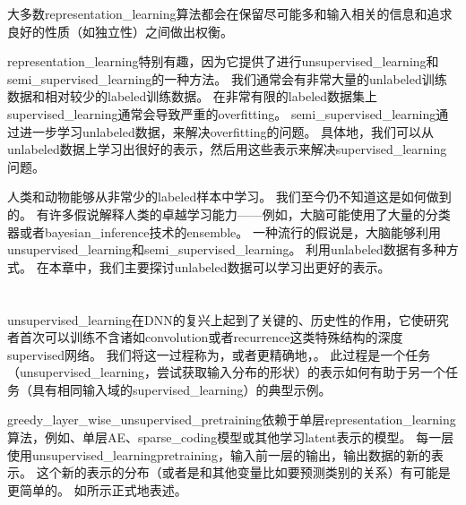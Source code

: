 大多数\gls{representation_learning}算法都会在保留尽可能多和输入相关的信息和追求良好的性质（如独立性）之间做出权衡。


\gls{representation_learning}特别有趣，因为它提供了进行\gls{unsupervised_learning}和\gls{semi_supervised_learning}的一种方法。
我们通常会有非常大量的\gls{unlabeled}训练数据和相对较少的\gls{labeled}训练数据。
在非常有限的\gls{labeled}数据集上\gls{supervised_learning}通常会导致严重的\gls{overfitting}。
\gls{semi_supervised_learning}通过进一步学习\gls{unlabeled}数据，来解决\gls{overfitting}的问题。
具体地，我们可以从\gls{unlabeled}数据上学习出很好的表示，然后用这些表示来解决\gls{supervised_learning}问题。

人类和动物能够从非常少的\gls{labeled}样本中学习。
我们至今仍不知道这是如何做到的。
有许多假说解释人类的卓越学习能力——例如，大脑可能使用了大量的分类器或者\gls{bayesian_inference}技术的\gls{ensemble}。
一种流行的假说是，大脑能够利用\gls{unsupervised_learning}和\gls{semi_supervised_learning}。
利用\gls{unlabeled}数据有多种方式。
在本章中，我们主要探讨\gls{unlabeled}数据可以学习出更好的表示。


\section{}
\label{sec:greedy_layer_wise_unsupervised_pretraining}
\gls{unsupervised_learning}在\gls{DNN}的复兴上起到了关键的、历史性的作用，它使研究者首次可以训练不含诸如\gls{convolution}或者\gls{recurrence}这类特殊结构的深度\gls{supervised}网络。
我们将这一过程称为，或者更精确地，。
此过程是一个任务（\gls{unsupervised_learning}，尝试获取输入分布的形状）的表示如何有助于另一个任务（具有相同输入域的\gls{supervised_learning}）的典型示例。


\gls{greedy_layer_wise_unsupervised_pretraining}依赖于单层\gls{representation_learning}算法，例如、单层\gls{AE}、\gls{sparse_coding}模型或其他学习\gls{latent}表示的模型。
每一层使用\gls{unsupervised_learning}\gls{pretraining}，输入前一层的输出，输出数据的新的表示。
这个新的表示的分布（或者是和其他变量比如要预测类别的关系）有可能是更简单的。
如所示正式地表述。

